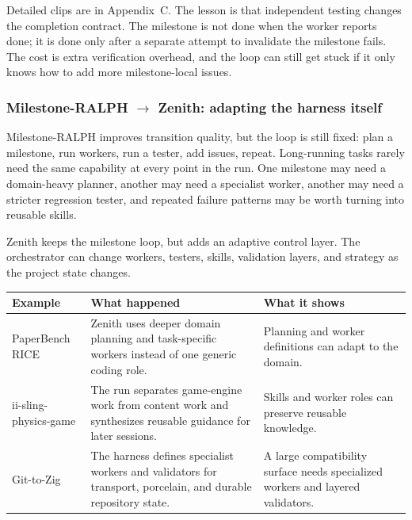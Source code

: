 \documentclass[11pt,a4paper]{article}
\renewcommand{\arraystretch}{1.18}
\newcommand{\code}[1]{#1}
\begin{document}
\vspace{6pt}

Detailed clips are in Appendix~C. The lesson is that independent testing changes the completion contract. The milestone is not done when the worker reports done; it is done only after a separate attempt to invalidate the milestone fails. The cost is extra verification overhead, and the loop can still get stuck if it only knows how to add more milestone-local issues.

\subsubsection{Milestone-RALPH $\rightarrow$ Zenith: adapting the harness itself}

Milestone-RALPH improves transition quality, but the loop is still fixed: plan a milestone, run workers, run a tester, add issues, repeat. Long-running tasks rarely need the same capability at every point in the run. One milestone may need a domain-heavy planner, another may need a specialist worker, another may need a stricter regression tester, and repeated failure patterns may be worth turning into reusable skills.

Zenith keeps the milestone loop, but adds an adaptive control layer. The orchestrator can change workers, testers, skills, validation layers, and strategy as the project state changes.

\begingroup
\renewcommand{\arraystretch}{1.25}
\setlength{\tabcolsep}{6pt}
\footnotesize
\noindent\begin{tabular}{@{}p{2.6cm}p{6.5cm}p{5.5cm}@{}}
\toprule
\rowcolor{tablehead}\textbf{\color{white}Example} & \textbf{\color{white}What happened} & \textbf{\color{white}What it shows} \\
\midrule
\code{PaperBench RICE} & Zenith uses deeper domain planning and task-specific workers instead of one generic coding role. & Planning and worker definitions can adapt to the domain. \\
\rowcolor{tableband}
\code{ii-sling-physics-game} & The run separates game-engine work from content work and synthesizes reusable guidance for later sessions. & Skills and worker roles can preserve reusable knowledge. \\
\code{Git-to-Zig} & The harness defines specialist workers and validators for transport, porcelain, and durable repository state. & A large compatibility surface needs specialized workers and layered validators. \\
\bottomrule
\end{tabular}
\endgroup
\end{document}
